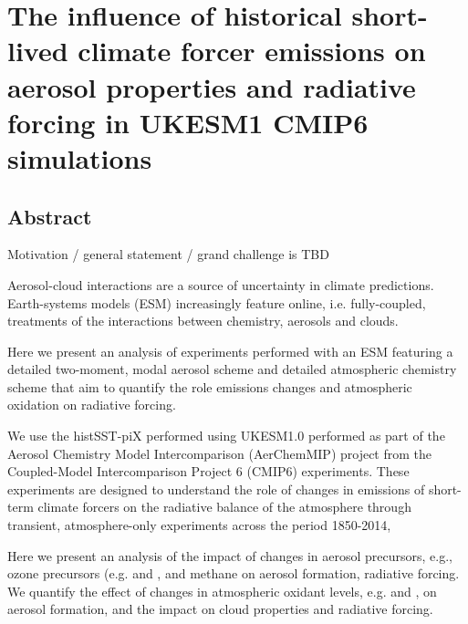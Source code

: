 \chapter{The influence of historical short-lived climate forcer emissions on aerosol properties and radiative forcing in UKESM1 CMIP6 simulations}
\label{ch3}
\ifpdf
    \graphicspath{{Chapter3/Figs/Raster/}{Chapter3/Figs/PDF/}{Chapter3/Figs/}}
\else
    \graphicspath{{Chapter3/Figs/Vector/}{Chapter3/Figs/}}
\fi



\section*{Abstract}
Motivation / general statement / grand challenge is TBD

Aerosol-cloud interactions are a source of uncertainty in climate predictions. Earth-systems models (ESM) increasingly feature online, i.e. fully-coupled, treatments of the interactions between chemistry, aerosols and clouds.  

Here we present an analysis of experiments performed with an ESM featuring a detailed two-moment, modal aerosol scheme and detailed atmospheric chemistry scheme that aim to quantify the role emissions changes and atmospheric oxidation on radiative forcing.

We use the histSST-piX performed using UKESM1.0 performed as part of the  Aerosol Chemistry Model Intercomparison (AerChemMIP) project from the Coupled-Model Intercomparison Project 6 (CMIP6) experiments. These experiments are designed to understand the role of changes in emissions of short-term climate forcers on the radiative balance of the atmosphere through transient, atmosphere-only experiments across the period 1850-2014, 

Here we present an analysis of the impact of changes in aerosol precursors, e.g., ozone precursors (e.g.  and , and methane on aerosol formation, radiative forcing. We quantify the effect of changes in atmospheric oxidant levels, e.g.  and , on aerosol formation, and the impact on cloud properties and radiative forcing.

